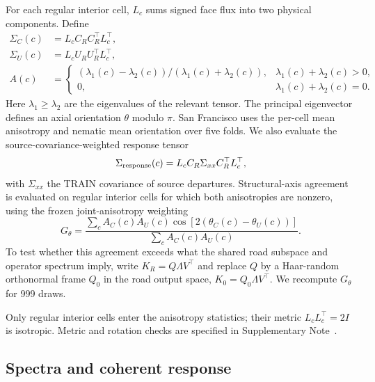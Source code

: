 \documentclass[11pt]{article}
\begin{document}
For each regular interior cell, $L_c$ sums signed face flux into two physical components. Define
\begin{equation}\label{eq:m-tensors}
\begin{aligned}
 \Sigma_C(c)&=L_cC_RC_R^\top L_c^\top,\\
 \Sigma_U(c)&=L_cU_RU_R^\top L_c^\top,\\
 A(c)&=\begin{cases}
 (\lambda_1(c)-\lambda_2(c))/(\lambda_1(c)+\lambda_2(c)),&\lambda_1(c)+\lambda_2(c)>0,\\
 0,&\lambda_1(c)+\lambda_2(c)=0 .
 \end{cases}
\end{aligned}
\end{equation}
Here $\lambda_1\geq\lambda_2$ are the eigenvalues of the relevant tensor. The principal eigenvector defines an axial orientation $\theta$ modulo $\pi$. San Francisco uses the per-cell mean anisotropy and nematic mean orientation over five folds. We also evaluate the source-covariance-weighted response tensor
\begin{equation}\label{eq:m-response-tensor}
 \Sigma_{\rm response}(c)=L_cC_R\Sigma_{xx}C_R^\top L_c^\top,
\end{equation}
with $\Sigma_{xx}$ the TRAIN covariance of source departures. Structural-axis agreement is evaluated on regular interior cells for which both anisotropies are nonzero, using the frozen joint-anisotropy weighting
\begin{equation}\label{eq:axis-agreement}
 G_{\theta}=\frac{\sum_c A_C(c)A_U(c)\cos[2(\theta_C(c)-\theta_U(c))]}
 {\sum_c A_C(c)A_U(c)} .
\end{equation}
To test whether this agreement exceeds what the shared road subspace and operator spectrum imply, write $K_R=Q\Lambda V^\top$ and replace $Q$ by a Haar-random orthonormal frame $Q_0$ in the road output space, $K_0=Q_0\Lambda V^\top$. We recompute $G_\theta$ for 999 draws.

Only regular interior cells enter the anisotropy statistics; their metric $L_cL_c^\top=2I$ is isotropic. Metric and rotation checks are specified in Supplementary Note~.

\subsection{Spectra and coherent response}
\end{document}
